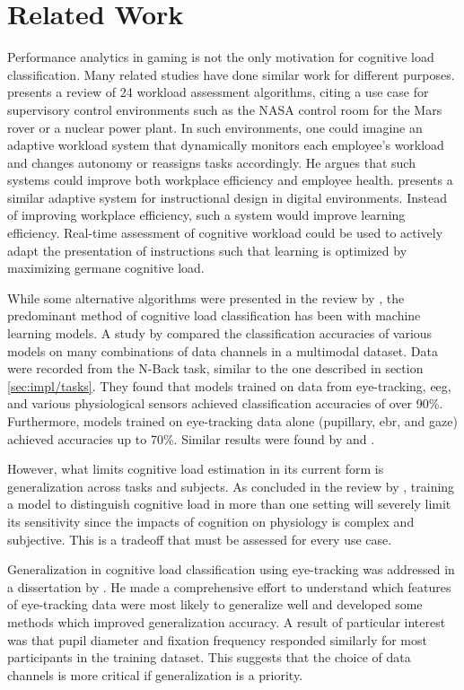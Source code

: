 \section{Related Work} \label{sec:bt/previous_work}

Performance analytics in gaming is not the only motivation for cognitive load classification. Many related studies have done similar work for different purposes. \textcite{heard2018} presents a review of 24 workload assessment algorithms, citing a use case for supervisory control environments such as the NASA control room for the Mars rover or a nuclear power plant. In such environments, one could imagine an adaptive workload system that dynamically monitors each employee's workload and changes autonomy or reassigns tasks accordingly. He argues that such systems could improve both workplace efficiency and employee health. \textcite{gerjets2014} presents a similar adaptive system for instructional design in digital environments. Instead of improving workplace efficiency, such a system would improve learning efficiency. Real-time assessment of cognitive workload could be used to actively adapt the presentation of instructions such that learning is optimized by maximizing germane cognitive load.

While some alternative algorithms were presented in the review by \textcite{heard2018}, the predominant method of cognitive load classification has been with machine learning models. A study by \textcite{hogervorst2014} compared the classification accuracies of various models on many combinations of data channels in a multimodal dataset. Data were recorded from the N-Back task, similar to the one described in section \ref{sec:impl/tasks}. They found that models trained on data from eye-tracking, \acrshort{eeg}, and various physiological sensors achieved classification accuracies of over 90\%. Furthermore, models trained on eye-tracking data alone (pupillary, \acrshort{ebr}, and gaze) achieved accuracies up to 70\%. Similar results were found by \textcite{lobo2016} and \textcite{wilson2010}.

However, what limits cognitive load estimation in its current form is generalization across tasks and subjects. As concluded in the review by \textcite{heard2018}, training a model to distinguish cognitive load in more than one setting will severely limit its sensitivity since the impacts of cognition on physiology is complex and subjective. This is a tradeoff that must be assessed for every use case. 

Generalization in cognitive load classification using eye-tracking was addressed in a dissertation by \textcite{appel2021}. He made a comprehensive effort to understand which features of eye-tracking data were most likely to generalize well and developed some methods which improved generalization accuracy. A result of particular interest was that pupil diameter and fixation frequency responded similarly for most participants in the training dataset. This suggests that the choice of data channels is more critical if generalization is a priority.